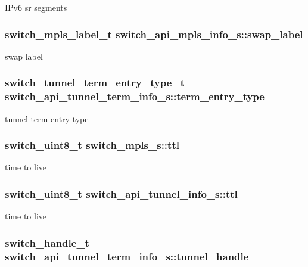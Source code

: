 I\+Pv6 sr segments \hypertarget{group__Tunnel_ga8d085b3d34b94d8f7d454f218d4383ae}{
\subsubsection[{swap\+\_\+label}]{\setlength{\rightskip}{0pt plus 5cm}switch\+\_\+mpls\+\_\+label\+\_\+t switch\+\_\+api\+\_\+mpls\+\_\+info\+\_\+s\+::swap\+\_\+label}}\label{group__Tunnel_ga8d085b3d34b94d8f7d454f218d4383ae}
swap label \hypertarget{group__Tunnel_ga3d6d200a504a59a4075506ccc5afaebe}{
\subsubsection[{term\+\_\+entry\+\_\+type}]{\setlength{\rightskip}{0pt plus 5cm}switch\+\_\+tunnel\+\_\+term\+\_\+entry\+\_\+type\+\_\+t switch\+\_\+api\+\_\+tunnel\+\_\+term\+\_\+info\+\_\+s\+::term\+\_\+entry\+\_\+type}}\label{group__Tunnel_ga3d6d200a504a59a4075506ccc5afaebe}
tunnel term entry type \hypertarget{group__Tunnel_ga0a0835cb20b911ab796b4050f6c6bb49}{
\subsubsection[{ttl}]{\setlength{\rightskip}{0pt plus 5cm}switch\+\_\+uint8\+\_\+t switch\+\_\+mpls\+\_\+s\+::ttl}}\label{group__Tunnel_ga0a0835cb20b911ab796b4050f6c6bb49}
time to live \hypertarget{group__Tunnel_ga86a3834db1f6b212b027d1f652021ffc}{
\subsubsection[{ttl}]{\setlength{\rightskip}{0pt plus 5cm}switch\+\_\+uint8\+\_\+t switch\+\_\+api\+\_\+tunnel\+\_\+info\+\_\+s\+::ttl}}\label{group__Tunnel_ga86a3834db1f6b212b027d1f652021ffc}
time to live \hypertarget{group__Tunnel_ga8741eaf6ce1e5362f4fe1a61fbb1b3a5}{
\subsubsection[{tunnel\+\_\+handle}]{\setlength{\rightskip}{0pt plus 5cm}switch\+\_\+handle\+\_\+t switch\+\_\+api\+\_\+tunnel\+\_\+term\+\_\+info\+\_\+s\+::tunnel\+\_\+handle}}\label{group__Tunnel_ga8741eaf6ce1e5362f4fe1a61fbb1b3a5}
